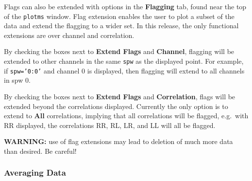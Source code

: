 Flags can also be extended with options in the {\bf Flagging} tab, found near the top of the {\tt plotms} window. Flag extension enables the user to plot a subset of the data and extend the flagging to a wider set. In this release, the only functional extensions are over channel and correlation.

By checking the boxes next to {\bf Extend Flags} and {\bf Channel}, flagging will be extended to other channels in the same {\tt spw} as the displayed point.  For example, if {\tt spw='0:0'} and channel 0 is displayed, then flagging will extend to all channels in spw 0.

By checking the boxes next to {\bf Extend Flags} and {\bf Correlation}, flags will be extended beyond the correlations displayed. Currently the only option is to extend to {\bf All} correlations, implying that all correlations will be flagged, e.g.\ with RR displayed, the correlations RR, RL, LR, and LL will all be flagged. 


{\bf WARNING:} use of flag extensions may lead to deletion of much more data than desired.  Be careful!




\subsubsection{Averaging Data}
\label{section:edit.plot.plotms.average}

